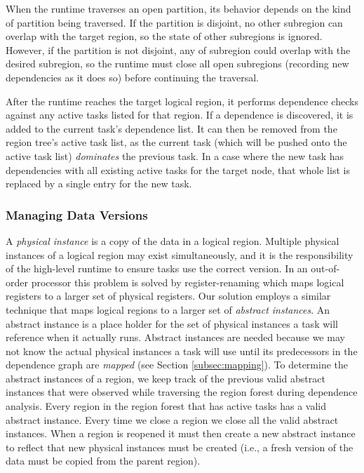 When the runtime traverses an open partition, its behavior depends on the kind
of partition being traversed.  If the partition is disjoint, no other subregion
can overlap with the target region, so the state of other subregions is
ignored.  However, if the partition is not disjoint, any 
of subregion could overlap with the desired subregion, so
the runtime must close all open subregions (recording new dependencies
as it does so) before continuing the traversal.

After the runtime reaches the target logical region, it performs dependence
checks against any active tasks listed for that region.  If a dependence is 
discovered, it is added to the current task's dependence list.  It can then
be removed from the region tree's active task list, as the current task (which
will be pushed onto the active task list) {\em dominates} the previous task.
In a case where the new task has dependencies with all existing active tasks
for the target node, that whole list is replaced by a single entry for the
new task.

\subsubsection{Managing Data Versions}
\label{subsec:dataflow}

A {\em physical instance} is a copy of the data in a logical region.  Multiple
physical instances of a logical region may exist simultaneously, and it is the responsibility of the high-level runtime
to ensure tasks use the correct version.
In an out-of-order processor this problem is solved by register-renaming which maps logical
registers to a larger set of physical registers.  Our solution employs a similar technique
that maps logical regions to a larger set of {\em abstract instances}.  An abstract instance
is a place holder for the set of physical instances a task will reference when it actually runs.  
Abstract instances are needed because we may not know the actual physical instances a task will
use until its predecessors in the dependence graph are {\em mapped} 
(see Section \ref{subsec:mapping}).  
To determine the abstract instances of a region, we keep track of 
the previous valid abstract instances that were observed while traversing the region forest
during dependence analysis.  Every region in the region forest that has active tasks
has a valid abstract instance.  Every time we close a region we close all the valid
abstract instances.  When a region is reopened it must then create a new abstract instance
to reflect that new physical instances must be created (i.e., a fresh version of the data must be copied from
the parent region).  


